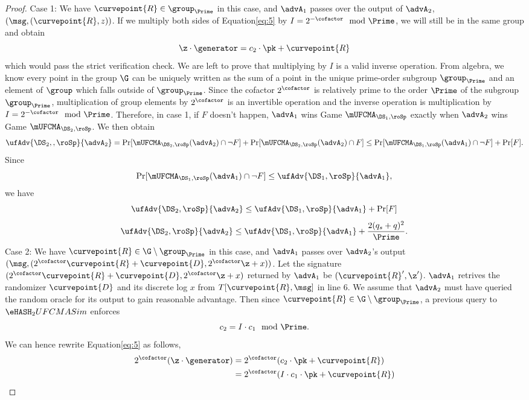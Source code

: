 \begin{proof}
	Case 1: We have $\curvepoint{R} \in \group_{\Prime}$ in this case, and $\advA_1$ passes over the output of $\advA_2$, $(\msg, (\curvepoint{R}, z))$.
	If we multiply both sides of Equation\eqref{eq:5} by $I=2^{-\cofactor} \mod \Prime$, we will still be in the same group and obtain
	\[\z \cdot  \generator = c_2 \cdot \pk + \curvepoint{R}\] which would pass the strict verification check. We are left to prove that multiplying by $I$ is a valid inverse operation. From algebra, we know every point in the group $\G$ can be uniquely written as the sum of a point in the unique prime-order subgroup $\group_{\Prime}$ and an element of $\group$ which falls outside of $\group_{\Prime}$. Since the  cofactor $2^\cofactor$ is relatively prime to the order $\Prime$ of the subgroup $\group_{\Prime}$, multiplication of group elements by $2^\cofactor$ is an invertible operation and the inverse operation is multiplication by $I = 2^{-\cofactor} \mod \Prime$. 
	Therefore, in case 1, if $F$ doesn't happen, $\advA_1$ wins Game $\mUFCMA_{\DS_1,\roSp}$ exactly when $\advA_2$ wins Game $\mUFCMA_{\DS_2,\roSp}$. We then obtain
	\[\ufAdv{\DS_2, ,\roSp}{\advA_2} = \Pr[\mUFCMA_{\DS_2,\roSp}(\advA_2) \cap \neg F] +  \Pr[\mUFCMA_{\DS_2,\roSp}(\advA_2) \cap F] \leq \Pr[\mUFCMA_{\DS_1,\roSp}(\advA_1) \cap \neg F] + \Pr[F] .\] 
	Since 
	\[ \Pr[\mUFCMA_{\DS_1,\roSp}(\advA_1) \cap \neg F] \leq \ufAdv{\DS_1, \roSp}{\advA_1} ,\]
	we have
	\[\ufAdv{\DS_2, \roSp}{\advA_2} \leq \ufAdv{\DS_1, \roSp}{\advA_1} + \Pr[F]\]
	\[\ufAdv{\DS_2, \roSp}{\advA_2} \leq \ufAdv{\DS_1, \roSp}{\advA_1} +  \frac{2(q_s + q)^2}{\Prime}.\]
	Case 2: We have $\curvepoint{R} \in \G \setminus \group_{\Prime}$ in this case, and $\advA_1$ passes over $\advA_2$'s output $(\msg, (2^\cofactor\curvepoint{R} + \curvepoint{D}, 2^\cofactor\z + x))$. Let the signature $(2^\cofactor\curvepoint{R} + \curvepoint{D}, 2^\cofactor\z + x)$ returned by $\advA_1$ be $(\curvepoint{R}', \z')$. $\advA_1$ retrives the randomizer $\curvepoint{D}$ and its discrete log $x$ from $T[\curvepoint{R},  \msg]$ in line 6. We assume that $\advA_2$ must have queried the random oracle for its output to gain reasonable advantage. Then since $\curvepoint{R} \in \G \setminus \group_{\Prime}$, a previous query to $\eHASH_2UFCMASim$ enforces 
	\[c_2 =  I \cdot c_1 \mod \Prime.\]
	We can hence rewrite Equation\eqref{eq:5}  as follows,
	\begin{align*} 
	2^\cofactor(\z \cdot  \generator) &= 2^\cofactor (c_2 \cdot \pk+ \curvepoint{R}) \\
	&=  2^\cofactor (I \cdot c_1 \cdot \pk + \curvepoint{R})\\

\end{align*}
\end{proof}

